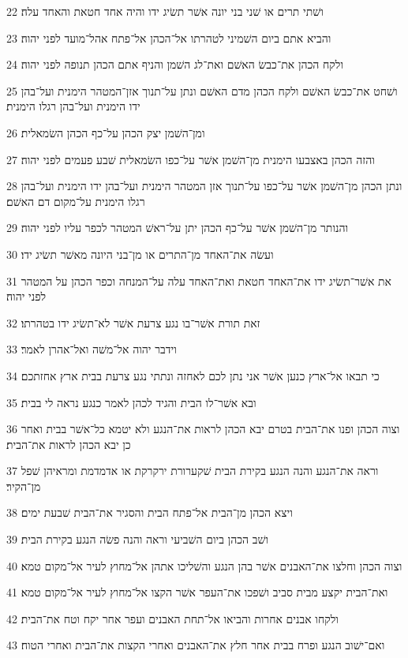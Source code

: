 \par 22 ושׁתי תרים או שׁני בני יונה אשׁר תשׂיג ידו והיה אחד חטאת והאחד עלה׃
\par 23 והביא אתם ביום השׁמיני לטהרתו אל־הכהן אל־פתח אהל־מועד לפני יהוה׃
\par 24 ולקח הכהן את־כבשׂ האשׁם ואת־לג השׁמן והניף אתם הכהן תנופה לפני יהוה׃
\par 25 ושׁחט את־כבשׂ האשׁם ולקח הכהן מדם האשׁם ונתן על־תנוך אזן־המטהר הימנית ועל־בהן ידו הימנית ועל־בהן רגלו הימנית׃
\par 26 ומן־השׁמן יצק הכהן על־כף הכהן השׂמאלית׃
\par 27 והזה הכהן באצבעו הימנית מן־השׁמן אשׁר על־כפו השׂמאלית שׁבע פעמים לפני יהוה׃
\par 28 ונתן הכהן מן־השׁמן אשׁר על־כפו על־תנוך אזן המטהר הימנית ועל־בהן ידו הימנית ועל־בהן רגלו הימנית על־מקום דם האשׁם׃
\par 29 והנותר מן־השׁמן אשׁר על־כף הכהן יתן על־ראשׁ המטהר לכפר עליו לפני יהוה׃
\par 30 ועשׂה את־האחד מן־התרים או מן־בני היונה מאשׁר תשׂיג ידו׃
\par 31 את אשׁר־תשׂיג ידו את־האחד חטאת ואת־האחד עלה על־המנחה וכפר הכהן על המטהר לפני יהוה׃
\par 32 זאת תורת אשׁר־בו נגע צרעת אשׁר לא־תשׂיג ידו בטהרתו׃
\par 33 וידבר יהוה אל־משׁה ואל־אהרן לאמר׃
\par 34 כי תבאו אל־ארץ כנען אשׁר אני נתן לכם לאחזה ונתתי נגע צרעת בבית ארץ אחזתכם׃
\par 35 ובא אשׁר־לו הבית והגיד לכהן לאמר כנגע נראה לי בבית׃
\par 36 וצוה הכהן ופנו את־הבית בטרם יבא הכהן לראות את־הנגע ולא יטמא כל־אשׁר בבית ואחר כן יבא הכהן לראות את־הבית׃
\par 37 וראה את־הנגע והנה הנגע בקירת הבית שׁקערורת ירקרקת או אדמדמת ומראיהן שׁפל מן־הקיר׃
\par 38 ויצא הכהן מן־הבית אל־פתח הבית והסגיר את־הבית שׁבעת ימים׃
\par 39 ושׁב הכהן ביום השׁביעי וראה והנה פשׂה הנגע בקירת הבית׃
\par 40 וצוה הכהן וחלצו את־האבנים אשׁר בהן הנגע והשׁליכו אתהן אל־מחוץ לעיר אל־מקום טמא׃
\par 41 ואת־הבית יקצע מבית סביב ושׁפכו את־העפר אשׁר הקצו אל־מחוץ לעיר אל־מקום טמא׃
\par 42 ולקחו אבנים אחרות והביאו אל־תחת האבנים ועפר אחר יקח וטח את־הבית׃
\par 43 ואם־ישׁוב הנגע ופרח בבית אחר חלץ את־האבנים ואחרי הקצות את־הבית ואחרי הטוח׃

